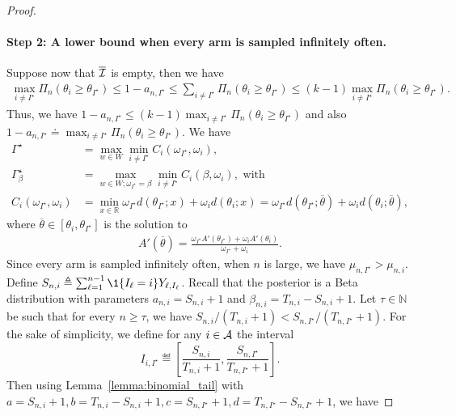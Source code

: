 \begin{proof}
\paragraph*{Step 2: A lower bound when every arm is sampled infinitely often.}
	Suppose now that $\overline{\mathcal{I}}$ is empty, then we have
	\begin{align*}
	\max_{i \neq I^\star} \Pi_{n}  (\theta_i \geq \theta_{I^\star} ) \leq 1 - a_{n,I^\star} \leq \sum_{i \neq I^\star} \Pi_{n}(\theta_i \geq \theta_{I^\star}) \leq (k-1) \max_{i \neq I^\star} \Pi_{n}(\theta_i \geq \theta_{I^\star}).
	\end{align*}
	Thus, we have $1 - a_{n,I^\star} \leq (k-1) \max_{i \neq I^\star} \Pi_{n}(\theta_i \geq \theta_{I^\star})$ and also $1 - a_{n,I^\star} \doteq \max_{i \neq I^\star} \Pi_{n}(\theta_i \geq \theta_{I^\star})$.	We have 
	\begin{align*}
	\Gamma^\star &= \max_{w \in W} \min_{i \neq I^\star} C_i(\omega_{I^\star}, \omega_i),\\
	\Gamma_{\beta}^\star &= \max_{w \in W;\omega_{I^\star} = \beta} \min_{i \neq I^\star} C_i(\beta, \omega_i), \text{   with}\\
	C_i(\omega_{I^\star}, \omega_i) &= \min_{x \in \mathbb{R}} \omega_{I^\star} d(\theta_{I^\star} ; x) + \omega_i d(\theta_{i} ; x)
	= \omega_{I^\star} d(\theta_{I^\star} ; \overline{\theta} ) + \omega_i d(\theta_{i} ; \overline{\theta} ),
	\end{align*}
	where $\overline{\theta} \in [ \theta_i, \theta_{I^\star}]$ is the solution to 
	\begin{align*}
	A'(\overline{\theta}) = \frac{\omega_{I^\star} A'(\theta_{I^\star}) + \omega_i A'(\theta_i)}{\omega_{I^\star} + \omega_i}.
	\end{align*}
Since every arm is sampled infinitely often, when $n$ is large, we have $\mu_{n,I^\star} > \mu_{n,i}$. Define $S_{n,i} \triangleq \sum_{\ell=1}^{n-1} \1{\{ I_{\ell} = i \}} Y_{\ell,I_{\ell}}$. Recall that the posterior is a Beta distribution with parameters $a_{n,i} = S_{n,i} +1$ and $\beta_{n,i} = T_{n,i} - S_{n,i} + 1$. Let $\tau \in \mathbb{N}$ be such that for every $n \geq \tau$, we have $S_{n, i} / (T_{n,i} + 1) < S_{n, I^\star} / (T_{n,I^\star} + 1)$. For the sake of simplicity, we define for any $i\in\mathcal{A}$ the interval
\[
    I_{i,I^\star}\eqdef \left[ \frac{S_{n,i}}{T_{n,i} + 1},  \frac{S_{n, I^\star}}{T_{n,I^\star} + 1} \right].
\] 
Then using Lemma~\ref{lemma:binomial_tail} with $a=S_{n,i}+1, b=T_{n,i}-S_{n,i}+1, c=S_{n,I^\star}+1, d=T_{n,I^\star}-S_{n,I^\star}+1$, we have

\end{proof}
